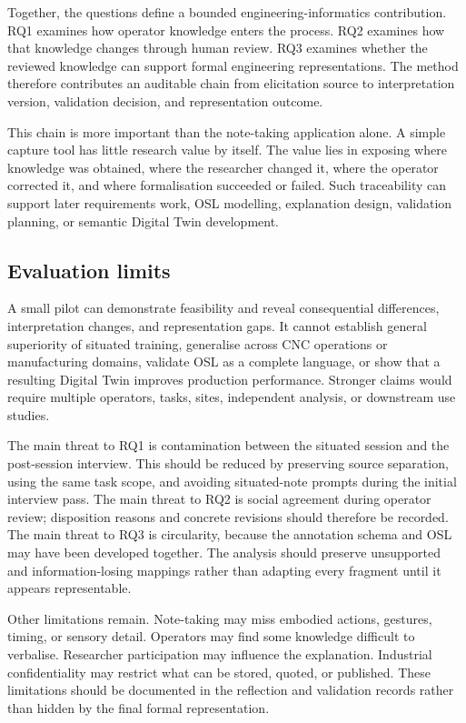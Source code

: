 Together, the questions define a bounded engineering-informatics contribution. RQ1 examines how operator knowledge enters the process. RQ2 examines how that knowledge changes through human review. RQ3 examines whether the reviewed knowledge can support formal engineering representations. The method therefore contributes an auditable chain from elicitation source to interpretation version, validation decision, and representation outcome.

This chain is more important than the note-taking application alone. A simple capture tool has little research value by itself. The value lies in exposing where knowledge was obtained, where the researcher changed it, where the operator corrected it, and where formalisation succeeded or failed. Such traceability can support later requirements work, OSL modelling, explanation design, validation planning, or semantic Digital Twin development.

\subsection{Evaluation limits}

A small pilot can demonstrate feasibility and reveal consequential differences, interpretation changes, and representation gaps. It cannot establish general superiority of situated training, generalise across CNC operations or manufacturing domains, validate OSL as a complete language, or show that a resulting Digital Twin improves production performance. Stronger claims would require multiple operators, tasks, sites, independent analysis, or downstream use studies.

The main threat to RQ1 is contamination between the situated session and the post-session interview. This should be reduced by preserving source separation, using the same task scope, and avoiding situated-note prompts during the initial interview pass. The main threat to RQ2 is social agreement during operator review; disposition reasons and concrete revisions should therefore be recorded. The main threat to RQ3 is circularity, because the annotation schema and OSL may have been developed together. The analysis should preserve unsupported and information-losing mappings rather than adapting every fragment until it appears representable.

Other limitations remain. Note-taking may miss embodied actions, gestures, timing, or sensory detail. Operators may find some knowledge difficult to verbalise. Researcher participation may influence the explanation. Industrial confidentiality may restrict what can be stored, quoted, or published. These limitations should be documented in the reflection and validation records rather than hidden by the final formal representation.

